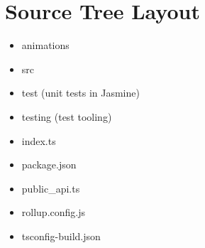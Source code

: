 \section{Source Tree Layout}


\begin{itemize}
  \item animations
  \item src
  \item test (unit tests in Jasmine)
  \item testing (test tooling)
\end{itemize}


\begin{itemize}
  \item index.ts
  \item package.json
  \item public\_api.ts
  \item rollup.config.js
  \item tsconfig-build.json
\end{itemize}
